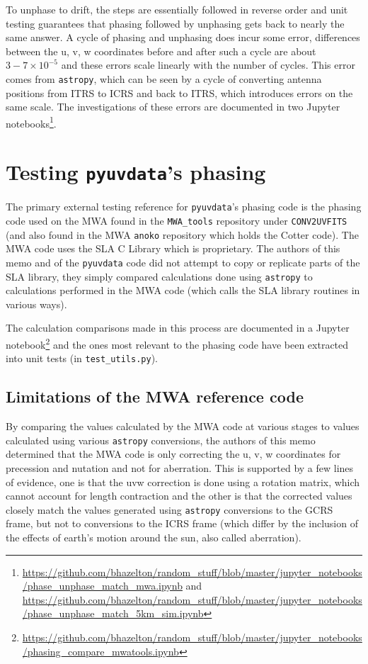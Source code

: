 \documentclass[11pt, oneside]{article}   	%
\begin{document}
To unphase to drift, the steps are essentially followed in reverse order and unit testing guarantees that phasing followed by unphasing gets back to nearly the same answer. A cycle of phasing and unphasing does incur some error, differences between the u, v, w coordinates before and after such a cycle are about ${3-7 \times 10^{-5}}$ and these errors scale linearly with the number of cycles. This error comes from \texttt{astropy}, which can be seen by a cycle of converting antenna positions from ITRS to ICRS and back to ITRS, which introduces errors on the same scale. The investigations of these errors are documented in two Jupyter notebooks\footnote{\url{https://github.com/bhazelton/random_stuff/blob/master/jupyter_notebooks/phase_unphase_match_mwa.ipynb} and \url{https://github.com/bhazelton/random_stuff/blob/master/jupyter_notebooks/phase_unphase_match_5km_sim.ipynb}}.

\section{Testing \texttt{pyuvdata}'s phasing}

The primary external testing reference for \texttt{pyuvdata}'s phasing code is the phasing code used on the MWA found in the \verb!MWA_tools! repository under \texttt{CONV2UVFITS} (and also found in the MWA \texttt{anoko} repository which holds the Cotter code). The MWA code uses the SLA C Library which is proprietary. The authors of this memo and of the \texttt{pyuvdata} code did not attempt to copy or replicate parts of the SLA library, they simply compared calculations done using \texttt{astropy} to calculations performed in the MWA code (which calls the SLA library routines in various ways).

The calculation comparisons made in this process are documented in a Jupyter notebook\footnote{\url{https://github.com/bhazelton/random_stuff/blob/master/jupyter_notebooks/phasing_compare_mwatools.ipynb}} and the ones most relevant to the phasing code have been extracted into unit tests (in \verb!test_utils.py!).

\subsection{Limitations of the MWA reference code}
By comparing the values calculated by the MWA code at various stages to values calculated using various \texttt{astropy} conversions, the authors of this memo determined that the MWA code is only correcting the u, v, w coordinates for precession and nutation and not for aberration. This is supported by a few lines of evidence, one is that the uvw correction is done using a rotation matrix, which cannot account for length contraction and the other is that the corrected values closely match the values generated using \texttt{astropy} conversions to the GCRS frame, but not to conversions to the ICRS frame (which differ by the inclusion of the effects of earth's motion around the sun, also called aberration).
\end{document}
